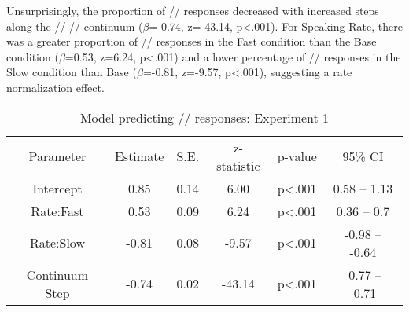 \documentclass[preprint]{JASA}
\begin{document}
Unsurprisingly, the proportion of /\textesh/ responses decreased with increased steps along the /\textesh/-/\textteshlig/ continuum (\(\beta\)=-0.74, z=-43.14, p\textless.001). For Speaking Rate, there was a greater proportion of /\textesh/ responses in the Fast condition than the Base condition (\(\beta\)=0.53, z=6.24, p\textless.001) and a lower percentage of /\textesh/ responses in the Slow condition than Base (\(\beta\)=-0.81, z=-9.57, p\textless.001), suggesting a rate normalization effect.

\begin{table}
\caption{\label{tab:exp1-sh-prop-model-summary}Model predicting /\textesh/ responses: Experiment 1}
\centering
\begin{tabular}[t]{cccccc}
\toprule
Parameter & Estimate & S.E. & z-statistic & p-value & 95\% CI\\
Intercept & 0.85 & 0.14 & 6.00 & p\textless.001 & 0.58 – 1.13\\
Rate:Fast & 0.53 & 0.09 & 6.24 & p\textless.001 & 0.36 – 0.7\\
Rate:Slow & -0.81 & 0.08 & -9.57 & p\textless.001 & -0.98 – -0.64\\
Continuum Step & -0.74 & 0.02 & -43.14 & p\textless.001 & -0.77 – -0.71\\
\end{tabular}
\end{table}


\end{document}
